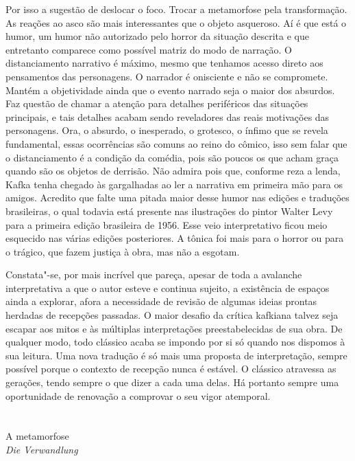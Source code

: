 Por isso a sugestão de deslocar o foco. Trocar a metamorfose pela
transformação. As reações ao asco são mais interessantes que o objeto
asqueroso. Aí é que está o humor, um humor não autorizado pelo horror
da situação descrita e que entretanto comparece como possível matriz do
modo de narração. O distanciamento narrativo é máximo, mesmo que
tenhamos acesso direto aos pensamentos das personagens. O narrador é
onisciente e não se compromete. Mantém a objetividade ainda que o
evento narrado seja o maior dos absurdos. Faz questão de chamar a
atenção para detalhes periféricos das situações principais, e tais
detalhes acabam sendo reveladores das reais motivações das personagens.
Ora, o absurdo, o inesperado, o grotesco, o ínfimo que se revela
fundamental, essas ocorrências são comuns ao reino do cômico, isso sem
falar que o distanciamento é a condição da comédia, pois são poucos os
que acham graça quando são os objetos de derrisão. Não admira pois que,
conforme reza a lenda, Kafka tenha chegado às gargalhadas ao ler a
narrativa em primeira mão para os amigos. Acredito que falte uma pitada
maior desse humor nas edições e traduções brasileiras, o qual todavia
está presente nas ilustrações do pintor Walter Levy para a primeira
edição brasileira de 1956. Esse veio interpretativo ficou meio esquecido nas
várias edições posteriores. A tônica foi mais para o horror ou para o
trágico, que fazem justiça à obra, mas não a esgotam.

Constata"-se, por mais incrível que pareça, apesar de toda a avalanche
interpretativa a que o autor esteve e continua sujeito, a existência de
espaços ainda a explorar, afora a necessidade de revisão de algumas
ideias prontas herdadas de recepções passadas. O maior desafio da
crítica kafkiana talvez seja escapar aos mitos e às múltiplas
interpretações preestabelecidas de sua obra. De qualquer modo, todo
clássico acaba se impondo por si só quando nos dispomos à sua leitura.
Uma nova tradução é só mais uma proposta de interpretação, sempre
possível porque o contexto de recepção nunca é estável. O clássico
atravessa as gerações, tendo sempre o que dizer a cada uma delas. Há
portanto sempre uma oportunidade de renovação a comprovar o seu vigor
atemporal.


\chapter*{}
\begin{center}
\begin{vplace}[0.3]
\Large
A metamorfose\\
\emph{Die Verwandlung}
\end{vplace}
\end{center}
\thispagestyle{empty}

